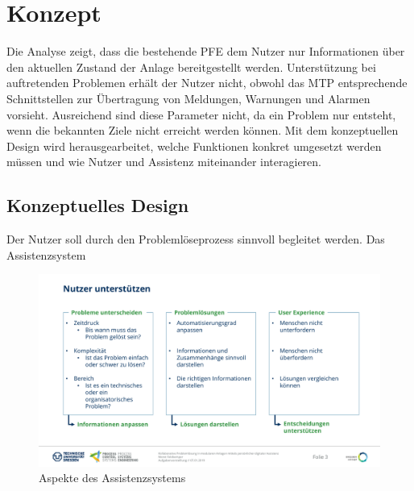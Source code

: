 \chapter{Konzept}
\label{sec:Konzept}
Die Analyse zeigt, dass die bestehende PFE dem Nutzer nur Informationen über den aktuellen Zustand der Anlage bereitgestellt werden. Unterstützung bei auftretenden Problemen erhält der Nutzer nicht, obwohl das MTP entsprechende Schnittstellen zur Übertragung von Meldungen, Warnungen und Alarmen vorsieht. Ausreichend sind diese Parameter nicht, da ein Problem nur entsteht, wenn die bekannten Ziele nicht erreicht werden können. Mit dem konzeptuellen Design wird herausgearbeitet, welche Funktionen konkret umgesetzt werden müssen und wie Nutzer und Assistenz miteinander interagieren.




\section{Konzeptuelles Design}
Der Nutzer soll durch den Problemlöseprozess sinnvoll begleitet werden. Das Assistenzsystem 

\begin{figure}[htbp]
\centering
\includegraphics[scale=0.45]{DA_files/Bilder/Konzept/Nutzer-unterstuetzen.pdf}
\caption{Aspekte des Assistenzsystems}
\label{pic:Nutzer-Unterstuetzen}
\end{figure}

